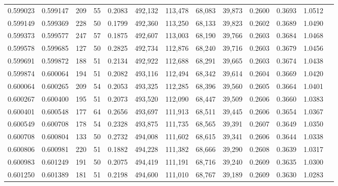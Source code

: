 \begin{tabular}{rrrrrrrrrrrrr}
0.599023 & 0.599147 &   209 &  55 &                                     0.2083 & 492,132 & 113,478 &  68,083 &  39,873 & 0.2600 & 0.3693 & 1.0512 \\
0.599149 & 0.599369 &   228 &  50 &                                     0.1799 & 492,360 & 113,250 &  68,133 &  39,823 & 0.2602 & 0.3689 & 1.0490 \\
0.599373 & 0.599577 &   247 &  57 &                                     0.1875 & 492,607 & 113,003 &  68,190 &  39,766 & 0.2603 & 0.3684 & 1.0468 \\
0.599578 & 0.599685 &   127 &  50 &                                     0.2825 & 492,734 & 112,876 &  68,240 &  39,716 & 0.2603 & 0.3679 & 1.0456 \\
0.599691 & 0.599872 &   188 &  51 &                                     0.2134 & 492,922 & 112,688 &  68,291 &  39,665 & 0.2603 & 0.3674 & 1.0438 \\
0.599874 & 0.600064 &   194 &  51 &                                     0.2082 & 493,116 & 112,494 &  68,342 &  39,614 & 0.2604 & 0.3669 & 1.0420 \\
0.600064 & 0.600265 &   209 &  54 &                                     0.2053 & 493,325 & 112,285 &  68,396 &  39,560 & 0.2605 & 0.3664 & 1.0401 \\
0.600267 & 0.600400 &   195 &  51 &                                     0.2073 & 493,520 & 112,090 &  68,447 &  39,509 & 0.2606 & 0.3660 & 1.0383 \\
0.600401 & 0.600548 &   177 &  64 &                                     0.2656 & 493,697 & 111,913 &  68,511 &  39,445 & 0.2606 & 0.3654 & 1.0367 \\
0.600549 & 0.600708 &   178 &  54 &                                     0.2328 & 493,875 & 111,735 &  68,565 &  39,391 & 0.2607 & 0.3649 & 1.0350 \\
0.600708 & 0.600804 &   133 &  50 &                                     0.2732 & 494,008 & 111,602 &  68,615 &  39,341 & 0.2606 & 0.3644 & 1.0338 \\
0.600806 & 0.600981 &   220 &  51 &                                     0.1882 & 494,228 & 111,382 &  68,666 &  39,290 & 0.2608 & 0.3639 & 1.0317 \\
0.600983 & 0.601249 &   191 &  50 &                                     0.2075 & 494,419 & 111,191 &  68,716 &  39,240 & 0.2609 & 0.3635 & 1.0300 \\
0.601250 & 0.601389 &   181 &  51 &                                     0.2198 & 494,600 & 111,010 &  68,767 &  39,189 & 0.2609 & 0.3630 & 1.0283 \\

\end{tabular}
